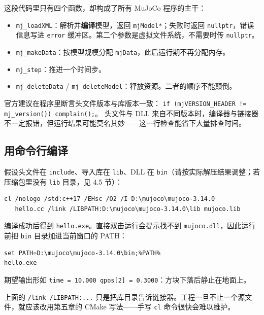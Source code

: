 这段代码里只有四个函数，却构成了所有 MuJoCo 程序的主干：

\begin{itemize}
	\item \texttt{mj\_loadXML}：解析并\textbf{编译}模型，返回 \texttt{mjModel*}；失败时返回 \texttt{nullptr}，错误信息写进 \texttt{error} 缓冲区。第二个参数是虚拟文件系统，不需要时传 \texttt{nullptr}。
	\item \texttt{mj\_makeData}：按模型规模分配 \texttt{mjData}，此后运行期不再分配内存。
	\item \texttt{mj\_step}：推进一个时间步。
	\item \texttt{mj\_deleteData} / \texttt{mj\_deleteModel}：释放资源。二者的顺序不能颠倒。
\end{itemize}

\begin{tipbox}[版本一致性检查]
	官方建议在程序里断言头文件版本与库版本一致：
	\texttt{if (mjVERSION\_HEADER != mj\_version()) complain();}。
	头文件与 DLL 来自不同版本时，编译器与链接器不一定报错，但运行结果可能莫名其妙——这一行检查能省下大量排查时间。
\end{tipbox}

\subsection{用命令行编译}

假设头文件在 \texttt{include}、导入库在 \texttt{lib}、DLL 在 \texttt{bin}（请按实际解压结果调整；若压缩包里没有 \texttt{lib} 目录，见 4.5 节）：

\begin{lstlisting}[style=shell]
cl /nologo /std:c++17 /EHsc /O2 /I D:\mujoco\mujoco-3.14.0
   hello.cc /link /LIBPATH:D:\mujoco\mujoco-3.14.0\lib mujoco.lib
\end{lstlisting}

编译成功后得到 \texttt{hello.exe}。直接双击运行会提示找不到 \texttt{mujoco.dll}，因此运行前把 \texttt{bin} 目录加进当前窗口的 PATH：

\begin{lstlisting}[style=shell]
set PATH=D:\mujoco\mujoco-3.14.0\bin;%PATH%
hello.exe
\end{lstlisting}

期望输出形如 \texttt{time = 10.000  qpos[2] = 0.3000}：方块下落后静止在地面上。

\begin{note}
	上面的 \texttt{/link /LIBPATH:...} 只是把库目录告诉链接器。工程一旦不止一个源文件，就应该改用第五章的 CMake 写法——手写 \texttt{cl} 命令很快会难以维护。
\end{note}

